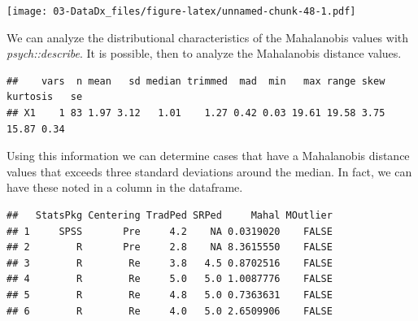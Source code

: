 \documentclass[
  11pt,
]{book}
\newenvironment{Shaded}{\begin{snugshade}}{\end{snugshade}}
\newcommand{\CommentTok}[1]{\textcolor[rgb]{0.37,0.37,0.37}{\textit{#1}}}
\newcommand{\ConstantTok}[1]{\textcolor[rgb]{0.37,0.37,0.37}{#1}}
\newcommand{\DecValTok}[1]{\textcolor[rgb]{0.06,0.06,0.06}{#1}}
\newcommand{\FunctionTok}[1]{\textcolor[rgb]{0.27,0.27,0.27}{\textbf{#1}}}
\newcommand{\NormalTok}[1]{#1}
\newcommand{\OtherTok}[1]{\textcolor[rgb]{0.37,0.37,0.37}{#1}}
\newcommand{\SpecialCharTok}[1]{\textcolor[rgb]{0.43,0.43,0.43}{\textbf{#1}}}
\begin{document}
\texttt{[image: 03-DataDx\_files/figure-latex/unnamed-chunk-48-1.pdf]}

We can analyze the distributional characteristics of the Mahalanobis values with \emph{psych::describe}. It is possible, then to analyze the Mahalanobis distance values.

\begin{Shaded}
\end{Shaded}

\begin{verbatim}
##    vars  n mean   sd median trimmed  mad  min   max range skew kurtosis   se
## X1    1 83 1.97 3.12   1.01    1.27 0.42 0.03 19.61 19.58 3.75    15.87 0.34
\end{verbatim}

Using this information we can determine cases that have a Mahalanobis distance values that exceeds three standard deviations around the median. In fact, we can have these noted in a column in the dataframe.

\begin{Shaded}
\end{Shaded}

\begin{verbatim}
##   StatsPkg Centering TradPed SRPed     Mahal MOutlier
## 1     SPSS       Pre     4.2    NA 0.0319020    FALSE
## 2        R       Pre     2.8    NA 8.3615550    FALSE
## 3        R        Re     3.8   4.5 0.8702516    FALSE
## 4        R        Re     5.0   5.0 1.0087776    FALSE
## 5        R        Re     4.8   5.0 0.7363631    FALSE
## 6        R        Re     4.0   5.0 2.6509906    FALSE
\end{verbatim}
\end{document}
